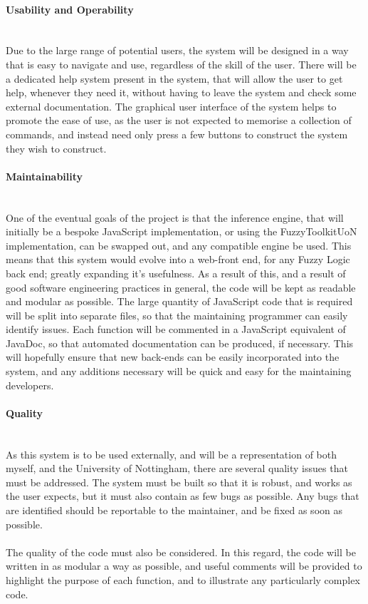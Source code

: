 \paragraph{Usability and Operability}\ \\
Due to the large range of potential users, the system will be designed in a way that is easy to navigate and use, regardless of the skill of the user. There will be a dedicated help system present in the system, that will allow the user to get help, whenever they need it, without having to leave the system and check some external documentation. The graphical user interface of the system helps to promote the ease of use, as the user is not expected to memorise a collection of commands, and instead need only press a few buttons to construct the system they wish to construct.

\paragraph{Maintainability}\ \\
One of the eventual goals of the project is that the inference engine, that will initially be a bespoke JavaScript implementation, or using the FuzzyToolkitUoN implementation, can be swapped out, and any compatible engine be used. This means that this system would evolve into a web-front end, for any Fuzzy Logic back end; greatly expanding it's usefulness. As a result of this, and a result of good software engineering practices in general, the code will be kept as readable and modular as possible. The large quantity of JavaScript code that is required will be split into separate files, so that the maintaining programmer can easily identify issues. Each function will be commented in a JavaScript equivalent of JavaDoc, so that automated documentation can be produced, if necessary. This will hopefully ensure that new back-ends can be easily incorporated into the system, and any additions necessary will be quick and easy for the maintaining developers.

\paragraph{Quality}\ \\
As this system is to be used externally, and will be a representation of both myself, and the University of Nottingham, there are several quality issues that must be addressed. The system must be built so that it is robust, and works as the user expects, but it must also contain as few bugs as possible. Any bugs that are identified should be reportable to the maintainer, and be fixed as soon as possible.\ \\
\ \\
The quality of the code must also be considered. In this regard, the code will be written in as modular a way as possible, and useful comments will be provided to highlight the purpose of each function, and to illustrate any particularly complex code.

